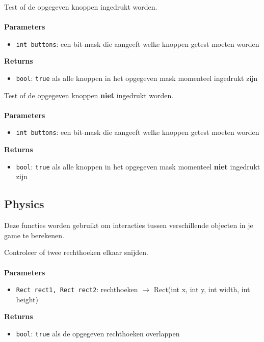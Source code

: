 \documentclass[11pt,fleqn]{book} %
\begin{document}
\begin{libf}
	Test of de opgegeven knoppen ingedrukt worden.\\ \\
	\textbf{Parameters}
	\begin{itemize}
		\item \texttt{int buttons}: een bit-mask die aangeeft welke knoppen getest moeten worden
	\end{itemize}
	\textbf{Returns}
	\begin{itemize}
		\item \texttt{bool}: \texttt{true} als alle knoppen in het opgegeven mask momenteel ingedrukt zijn
	\end{itemize}
\end{libf}

\begin{libf}
	Test of de opgegeven knoppen \textbf{niet} ingedrukt worden.\\ \\
	\textbf{Parameters}
	\begin{itemize}
		\item \texttt{int buttons}: een bit-mask die aangeeft welke knoppen getest moeten worden
	\end{itemize}
	\textbf{Returns}
	\begin{itemize}
		\item \texttt{bool}: \texttt{true} als alle knoppen in het opgegeven mask momenteel \textbf{niet} ingedrukt zijn
	\end{itemize}
\end{libf}

\newpage

\subsection{Physics}
Deze functies worden gebruikt om interacties tussen verschillende objecten in je game te berekenen.

\begin{libf}
	Controleer of twee rechthoeken elkaar snijden.\\ \\
	\textbf{Parameters}
	\begin{itemize}
		\item \texttt{Rect rect1, Rect rect2}: rechthoeken $\rightarrow$ Rect(int x, int y, int width, int height)
	\end{itemize}
	\textbf{Returns}
	\begin{itemize}
		\item \texttt{bool}: \texttt{true} als de opgegeven rechthoeken overlappen
	\end{itemize}
\end{libf}
\end{document}
